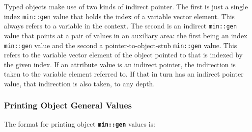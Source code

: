 \documentclass[12pt]{article}
\newcommand{\TT}[1]{{\tt \bfseries #1}}
\begin{document}
Typed objects make use of two kinds of indirect pointer.  The first is
just a single index \verb|min::gen| value that holds the index of a
variable vector element.  This always refers to a variable in the context.
The second is an indirect \verb|min::gen| value that points at a pair
of values in an auxiliary area: the first being an index \verb|min::gen|
value and the second a pointer-to-object-stub \verb|min::gen| value.
This refers to the variable vector element of the object pointed to
that is indexed by the given index.  If an attribute value is an indirect
pointer, the indirection is taken to the variable element referred to.
If that in turn has an indirect pointer value, that indirection is also
taken, to any depth.

\subsubsection{Printing Object General Values}
\label{PRINTING-OBJECT-GENERAL-VALUES}

The format for printing object \TT{min::gen} values is:
\end{document}
